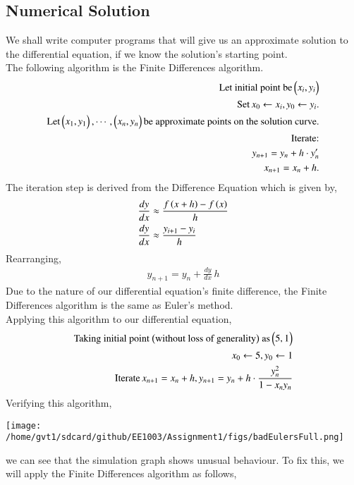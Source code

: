 \documentclass[journal]{IEEEtran}
\begin{document}
\subsection*{Numerical Solution}
We shall write computer programs that will give us an approximate solution to the differential equation, if we know the solution's starting point.\\
The following algorithm is the Finite Differences algorithm.
\begin{align*}
	\text{Let initial point be} \begin{pmatrix}x_i, y_i\end{pmatrix}&\\
	\text{Set}\, x_0\leftarrow x_i, y_0\leftarrow y_i. \\\text{Let} \begin{pmatrix}x_1, y_1\end{pmatrix}, \cdots, \begin{pmatrix}x_n, y_n\end{pmatrix} \text{be approximate points on the solution curve.}&\\
	\text{Iterate:} \\y_{n+1} = y_{n} + h \cdot y_n^{\prime} \\ x_{n+1} = x_n + h.&
\end{align*}
The iteration step is derived from the Difference Equation which is given by,
\begin{align}
	\frac{dy}{dx} &\approx \frac{f\left(x+h\right) -f\left(x\right)}{h}\\ 
	\frac{dy}{dx} &\approx \frac{y_{i+1} - y_i}{h}
\end{align}
Rearranging,
\begin{align}
	y_{n+1} = y_n + \frac{dy}{dx} \, h
\end{align}
Due to the nature of our differential equation's finite difference, the Finite Differences algorithm is the same as Euler's method.\\
Applying this algorithm to our differential equation,
\begin{align}
	\text{Taking initial point \ensuremath{\left(\text{without loss of generality}\right)} as} \begin{pmatrix}5, 1\end{pmatrix}\\
	x_0\leftarrow 5, y_0\leftarrow 1\\
	\text{Iterate}\, x_{n+1} = x_n + h, y_{n+1} = y_n + h \cdot \frac{y_n^2}{1-x_ny_n}
\end{align}
Verifying this algorithm,
\begin{center} 
	\texttt{[image: /home/gvt1/sdcard/github/EE1003/Assignment1/figs/badEulersFull.png]}  
\end{center}
we can see that the simulation graph shows unusual behaviour. To fix this, we will apply the Finite Differences algorithm as follows,
\end{document}
